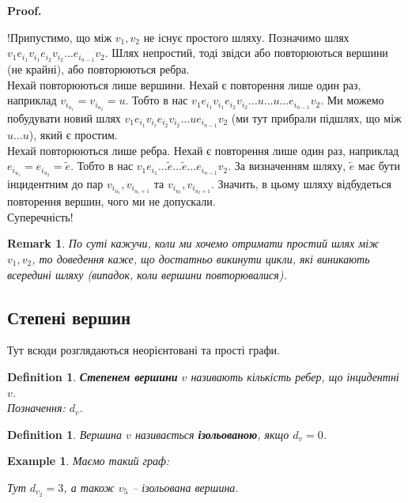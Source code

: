 \documentclass[a4paper, 14pt]{extarticle}
\makeatletter
\theoremstyle{theoremdd}
\theoremstyle{theoremdd}
\newtheorem{definition}[theorem]{Definition}
\theoremstyle{theoremdd}
\theoremstyle{theoremdd}
\theoremstyle{theoremdd}
\newtheorem{example}[theorem]{Example}
\theoremstyle{theoremdd}
\theoremstyle{theoremdd}
\theoremstyle{theoremdd}
\theoremstyle{theoremdd}
\theoremstyle{theoremdd}
\theoremstyle{theoremdd}
\newtheorem{remark}[theorem]{Remark}
\theoremstyle{theoremdd}
\theoremstyle{theoremdd}
\theoremstyle{theoremdd}
\theoremstyle{theoremdd}
\renewenvironment{proof}[1][Proof.\\]{\par
\pushQED{\hfill \qed}%
\normalfont \topsep6\p@\@plus6\p@\relax
\trivlist
\item\relax
{\bfseries
#1\@addpunct{.}}\hspace\labelsep\ignorespaces
}{%
\popQED\endtrivlist\@endpefalse
}
\makeatother
\begin{document}
\begin{proof}
!Припустимо, що між $v_1,v_2$ не існує простого шляху. Позначимо шлях $v_1e_{i_1}v_{i_1}e_{i_2}v_{i_2} \dots e_{i_{n-1}}v_2$. Шлях непростий, тоді звідси або повторюються вершини (не крайні), або повторюються ребра.\\
Нехай повторюються лише вершини. Нехай є повторення лише один раз, наприклад $v_{i_{u_1}} = v_{i_{u_2}} = u$. Тобто в нас $v_1e_{i_1}v_{i_1}e_{i_2}v_{i_2} \dots u \dots u \dots  e_{i_{n-1}}v_2$. Ми можемо побудувати новий шлях $v_1e_{i_1}v_{i_i}e_{i_2}v_{i_2} \dots u e_{i_{n-1}}v_2$ (ми тут прибрали підшлях, що між $u \dots u$), який є простим.\\
Нехай повторюються лише ребра. Нехай є повторення лише один раз, наприклад $e_{i_{u_1}} = e_{i_{u_2}} = \tilde{e}$. Тобто в нас $v_1 e_{i_1} \dots \tilde{e} \dots \tilde{e} \dots e_{i_{n-1}}v_2$. За визначенням шляху, $\tilde{e}$ має бути інцидентним до пар $v_{i_{u_1}}, v_{i_{u_1+1}}$ та $v_{i_{u_2}}, v_{i_{u_2+1}}$. Значить, в цьому шляху відбудеться повторення вершин, чого ми не допускали.\\
Суперечність!
\end{proof}

\begin{remark}
По суті кажучи, коли ми хочемо отримати простий шлях між $v_1,v_2$, то доведення каже, що достатньо викинути цикли, які виникають всередині шляху (випадок, коли вершини повторювалися).
\end{remark}

\subsection{Степені вершин}
Тут всюди розглядаються неорієнтовані та прості графи.

\begin{definition}
\textbf{Степенем вершини} $v$ називають кількість ребер, що інцидентні $v$.\\
Позначення: $d_v$.
\end{definition}

\begin{definition}
Вершина $v$ називається \textbf{ізольованою}, якщо $d_v = 0$.
\end{definition}

\begin{example}
Маємо такий граф:
\begin{figure}[H]
\centering
{}
\end{figure}
Тут $d_{v_2} = 3$, а також $v_5$ -- ізольована вершина.
\end{example}
\end{document}

